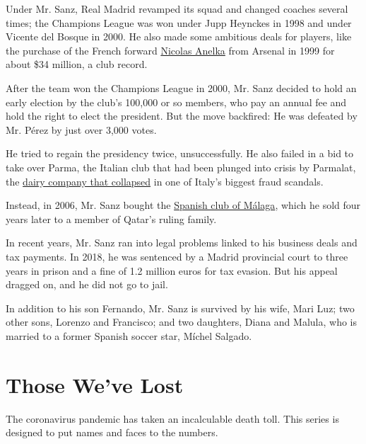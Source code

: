 Under Mr. Sanz, Real Madrid revamped its squad and changed coaches
several times; the Champions League was won under Jupp Heynckes in 1998
and under Vicente del Bosque in 2000. He also made some ambitious deals
for players, like the purchase of the French forward
\href{https://www.nytimes3xbfgragh.onion/2000/03/16/sports/IHT-anelkas-shadow-casts-gloom-over-real-madrid.html}{Nicolas
Anelka} from Arsenal in 1999 for about \$34 million, a club record.

After the team won the Champions League in 2000, Mr. Sanz decided to
hold an early election by the club's 100,000 or so members, who pay an
annual fee and hold the right to elect the president. But the move
backfired: He was defeated by Mr. Pérez by just over 3,000 votes.

He tried to regain the presidency twice, unsuccessfully. He also failed
in a bid to take over Parma, the Italian club that had been plunged into
crisis by Parmalat, the
\href{https://www.nytimes3xbfgragh.onion/2004/01/11/business/the-rise-and-fall-of-parma-s-first-family.html}{dairy
company that collapsed} in one of Italy's biggest fraud scandals.

Instead, in 2006, Mr. Sanz bought the
\href{https://www.nytimes3xbfgragh.onion/2012/10/05/sports/soccer/05iht-malaga05.html}{Spanish
club of Málaga}, which he sold four years later to a member of Qatar's
ruling family.

In recent years, Mr. Sanz ran into legal problems linked to his business
deals and tax payments. In 2018, he was sentenced by a Madrid provincial
court to three years in prison and a fine of 1.2 million euros for tax
evasion. But his appeal dragged on, and he did not go to jail.

In addition to his son Fernando, Mr. Sanz is survived by his wife, Mari
Luz; two other sons, Lorenzo and Francisco; and two daughters, Diana and
Malula, who is married to a former Spanish soccer star, Míchel Salgado.

\href{https://www.nytimes3xbfgragh.onion/interactive/2020/obituaries/people-died-coronavirus-obituaries.html?action=click\&pgtype=Article\&state=default\&region=BELOW_MAIN_CONTENT\&context=covid_obits_promo}{}

\hypertarget{those-weve-lost}{%
\section{Those We've Lost}\label{those-weve-lost}}

The coronavirus pandemic has taken an incalculable death toll. This
series is designed to put names and faces to the numbers.

